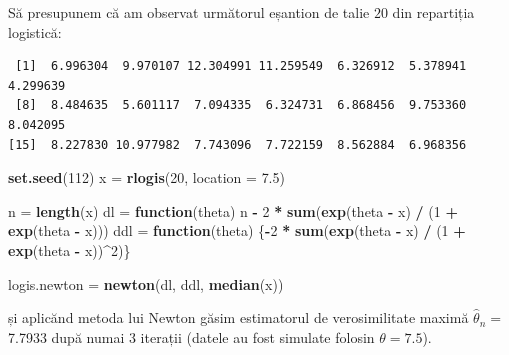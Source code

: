 \documentclass[
]{article}
\newenvironment{Shaded}{\begin{snugshade}}{\end{snugshade}}
\newcommand{\ControlFlowTok}[1]{\textcolor[rgb]{0.13,0.29,0.53}{\textbf{#1}}}
\newcommand{\DataTypeTok}[1]{\textcolor[rgb]{0.13,0.29,0.53}{#1}}
\newcommand{\DecValTok}[1]{\textcolor[rgb]{0.00,0.00,0.81}{#1}}
\newcommand{\FloatTok}[1]{\textcolor[rgb]{0.00,0.00,0.81}{#1}}
\newcommand{\KeywordTok}[1]{\textcolor[rgb]{0.13,0.29,0.53}{\textbf{#1}}}
\newcommand{\NormalTok}[1]{#1}
\newcommand{\OperatorTok}[1]{\textcolor[rgb]{0.81,0.36,0.00}{\textbf{#1}}}
\newcommand{\StringTok}[1]{\textcolor[rgb]{0.31,0.60,0.02}{#1}}
\begin{document}
Să presupunem că am observat următorul eșantion de talie \(20\) din
repartiția logistică:

\begin{verbatim}
 [1]  6.996304  9.970107 12.304991 11.259549  6.326912  5.378941  4.299639
 [8]  8.484635  5.601117  7.094335  6.324731  6.868456  9.753360  8.042095
[15]  8.227830 10.977982  7.743096  7.722159  8.562884  6.968356
\end{verbatim}

\begin{Shaded}
\begin{Highlighting}[]
\KeywordTok{set.seed}\NormalTok{(}\DecValTok{112}\NormalTok{)}
\NormalTok{x =}\StringTok{ }\KeywordTok{rlogis}\NormalTok{(}\DecValTok{20}\NormalTok{, }\DataTypeTok{location =} \FloatTok{7.5}\NormalTok{)}

\NormalTok{n =}\StringTok{ }\KeywordTok{length}\NormalTok{(x)}
\NormalTok{dl =}\StringTok{ }\ControlFlowTok{function}\NormalTok{(theta) n }\OperatorTok{-}\StringTok{ }\DecValTok{2} \OperatorTok{*}\StringTok{ }\KeywordTok{sum}\NormalTok{(}\KeywordTok{exp}\NormalTok{(theta }\OperatorTok{-}\StringTok{ }\NormalTok{x) }\OperatorTok{/}\StringTok{ }\NormalTok{(}\DecValTok{1} \OperatorTok{+}\StringTok{ }\KeywordTok{exp}\NormalTok{(theta }\OperatorTok{-}\StringTok{ }\NormalTok{x)))}
\NormalTok{ddl =}\StringTok{ }\ControlFlowTok{function}\NormalTok{(theta) \{}\OperatorTok{-}\DecValTok{2} \OperatorTok{*}\StringTok{ }\KeywordTok{sum}\NormalTok{(}\KeywordTok{exp}\NormalTok{(theta }\OperatorTok{-}\StringTok{ }\NormalTok{x) }\OperatorTok{/}\StringTok{ }\NormalTok{(}\DecValTok{1} \OperatorTok{+}\StringTok{ }\KeywordTok{exp}\NormalTok{(theta }\OperatorTok{-}\StringTok{ }\NormalTok{x))}\OperatorTok{^}\DecValTok{2}\NormalTok{)\}}

\NormalTok{logis.newton =}\StringTok{ }\KeywordTok{newton}\NormalTok{(dl, ddl, }\KeywordTok{median}\NormalTok{(x))}
\end{Highlighting}
\end{Shaded}

și aplicănd metoda lui Newton găsim estimatorul de verosimilitate maximă
\(\hat{\theta}_n=\) 7.7933 după numai 3 iterații (datele au fost
simulate folosin \(\theta = 7.5\)).
\end{document}
